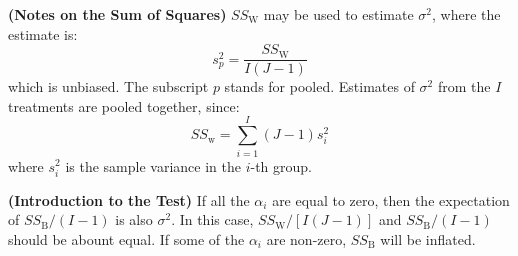 \begin{remark}{\textbf{(Notes on the Sum of Squares)}}
    $SS_\text{W}$ may be used to estimate $\sigma^2$, where the estimate is:
    \begin{equation*}
        s_p^2 = \frac{SS_\text{W}}{I(J-1)}
    \end{equation*}
    which is unbiased. The subscript $p$ stands for pooled. Estimates of $\sigma^2$ from the $I$ treatments are pooled together, since:
    \begin{equation*}
        SS_\text{w} = \sum^I_{i=1}(J-1)s_i^2
    \end{equation*}
    where $s_i^2$ is the sample variance in the $i$-th group. 
\end{remark}

\begin{remark}{\textbf{(Introduction to the Test)}}
    If all the $\alpha_i$ are equal to zero, then the expectation of $SS_\text{B}/(I-1)$  is also $\sigma^2$. In this case, $SS_\text{W}/[I(J-1)]$ and $SS_\text{B}/(I-1)$ should be abount equal. If some of the $\alpha_i$ are non-zero, $SS_\text{B}$ will be inflated. 
\end{remark}

